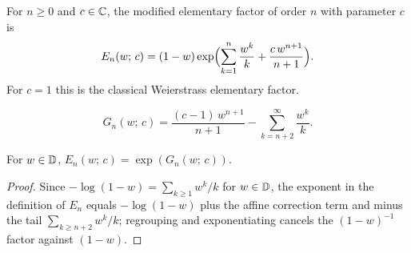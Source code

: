 \begin{definition}
  \label{def:E}
  \leanok
  For $n \ge 0$ and $c \in \mathbb{C}$, the modified elementary factor of order
  $n$ with parameter $c$ is
  \[
    E_n(w;\,c) = (1-w)\exp\Bigl(\sum_{k=1}^{n}\frac{w^k}{k} +
      \frac{c\,w^{n+1}}{n+1}\Bigr).
  \]
  For $c = 1$ this is the classical Weierstrass elementary factor.
\end{definition}

\begin{definition}
  \label{def:G}
  \leanok
  \[
    G_n(w;\,c) = \frac{(c-1)\,w^{n+1}}{n+1} - \sum_{k=n+2}^{\infty}\frac{w^k}{k}.
  \]
\end{definition}

\begin{lemma}[$E_n = \exp(G_n)$ on $\D$]
  \label{lem:Eexp}
  \leanok
  For $w \in \mathbb{D}$, $E_n(w;\,c) = \exp(G_n(w;\,c))$.
\end{lemma}
\begin{proof}
  \leanok
  Since $-\log(1-w) = \sum_{k \ge 1} w^k/k$ for $w \in \mathbb{D}$, the exponent
  in the definition of $E_n$ equals $-\log(1-w)$ plus the affine
  correction term and minus the tail $\sum_{k \ge n+2} w^k/k$; regrouping
  and exponentiating cancels the $(1-w)^{-1}$ factor against $(1-w)$.
\end{proof}

